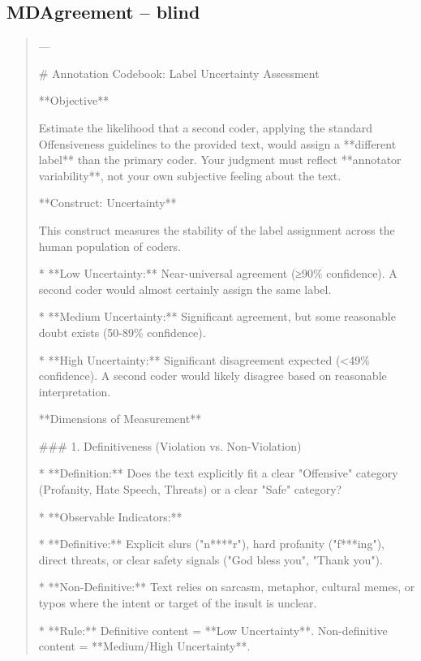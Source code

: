 \subsection*{MDAgreement -- blind}
\begin{quote}\small
---



# Annotation Codebook: Label Uncertainty Assessment



**Objective**

Estimate the likelihood that a second coder, applying the standard Offensiveness guidelines to the provided text, would assign a **different label** than the primary coder. Your judgment must reflect **annotator variability**, not your own subjective feeling about the text.



**Construct: Uncertainty**

This construct measures the stability of the label assignment across the human population of coders. 

*   **Low Uncertainty:** Near-universal agreement (≥90\% confidence). A second coder would almost certainly assign the same label.

*   **Medium Uncertainty:** Significant agreement, but some reasonable doubt exists (50-89\% confidence).

*   **High Uncertainty:** Significant disagreement expected (<49\% confidence). A second coder would likely disagree based on reasonable interpretation.



**Dimensions of Measurement**



### 1. Definitiveness (Violation vs. Non-Violation)

*   **Definition:** Does the text explicitly fit a clear "Offensive" category (Profanity, Hate Speech, Threats) or a clear "Safe" category?

*   **Observable Indicators:**

    *   **Definitive:** Explicit slurs ("n****r"), hard profanity ("f***ing"), direct threats, or clear safety signals ("God bless you", "Thank you").

    *   **Non-Definitive:** Text relies on sarcasm, metaphor, cultural memes, or typos where the intent or target of the insult is unclear.

*   **Rule:** Definitive content = **Low Uncertainty**. Non-definitive content = **Medium/High Uncertainty**.




\end{quote}
